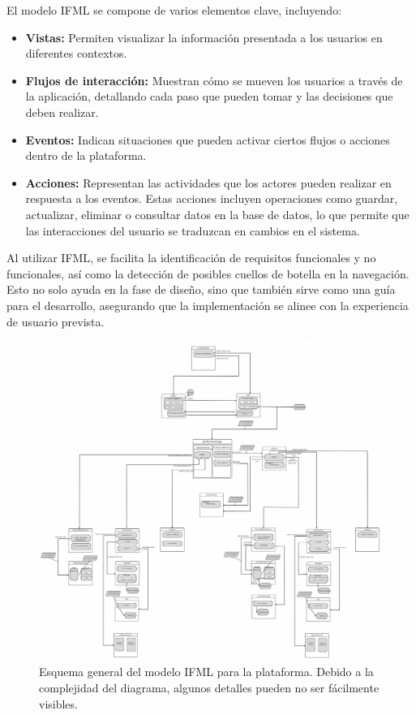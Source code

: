 \documentclass{article}
\begin{document}
El modelo IFML se compone de varios elementos clave, incluyendo:

\begin{itemize}
	\item \textbf{Vistas:} Permiten visualizar la información presentada a los usuarios en diferentes contextos.
	\item \textbf{Flujos de interacción:} Muestran cómo se mueven los usuarios a través de la aplicación, detallando cada paso que pueden tomar y las decisiones que deben realizar.
	\item \textbf{Eventos:} Indican situaciones que pueden activar ciertos flujos o acciones dentro de la plataforma.
	\item \textbf{Acciones:} Representan las actividades que los actores pueden realizar en respuesta a los eventos. Estas acciones incluyen operaciones como guardar, actualizar, eliminar o consultar datos en la base de datos, lo que permite que las interacciones del usuario se traduzcan en cambios en el sistema.
\end{itemize}

Al utilizar IFML, se facilita la identificación de requisitos funcionales y no funcionales, así como la detección de posibles cuellos de botella en la navegación. Esto no solo ayuda en la fase de diseño, sino que también sirve como una guía para el desarrollo, asegurando que la implementación se alinee con la experiencia de usuario prevista. 


\begin{figure}[H]
	\centering
	\includegraphics[width=\textwidth]{images/ifml_general.png}
	\caption{Esquema general del modelo IFML para la plataforma. Debido a la complejidad del diagrama, algunos detalles pueden no ser fácilmente visibles.}
	\label{fig:ifml_general}
\end{figure}
\end{document}
